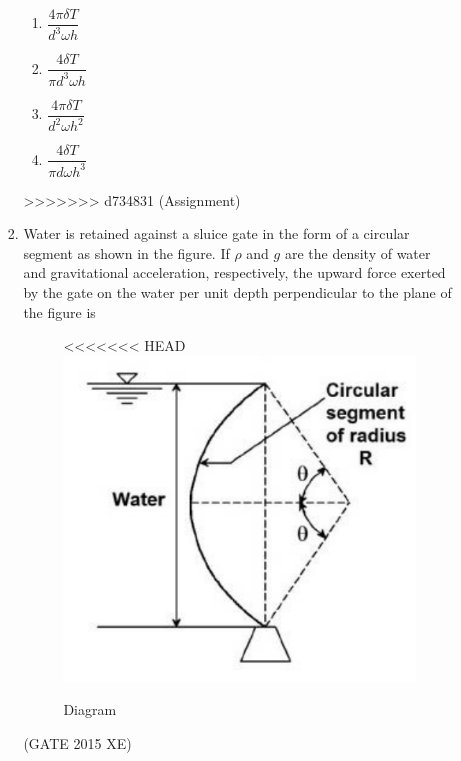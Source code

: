 \documentclass[journal,12pt,onecolumn]{IEEEtran}
\begin{document}
\begin{enumerate}
\begin{enumerate}
\begin{enumerate}[label=\arabic*)]
\vspace{0.2cm}
\begin{enumerate}[label=\alph*)]
\item $\dfrac{4\pi \delta T}{d^3 \omega h}$
\vspace{0.1cm}
\item $\dfrac{4\delta T}{\pi d^3 \omega h}$
\vspace{0.1cm}
\item $\dfrac{4\pi \delta T}{d^2 \omega h^2}$
\vspace{0.1cm}
\item $\dfrac{4\delta T}{\pi d \omega h^3}$
\end{enumerate}
\vspace{0.5cm}
>>>>>>> d734831 (Assignment)

\item Water is retained against a sluice gate in the form of a circular segment as shown in the figure. If $\rho$ and $g$ are the density of water and gravitational acceleration, respectively, the upward force exerted by the gate on the water per unit depth perpendicular to the plane of the figure is  

\begin{figure}[htbp]
  \centering
<<<<<<< HEAD
  \includegraphics[width=.6\columnwidth]{figs/B/fig1.png} 
  \caption{Diagram}
  \label{fig:figs/B/fig1.png}
\end{figure}


\hfill{(GATE 2015 XE)} \\


\end{enumerate}
\end{enumerate}
\end{enumerate}
\end{document}
